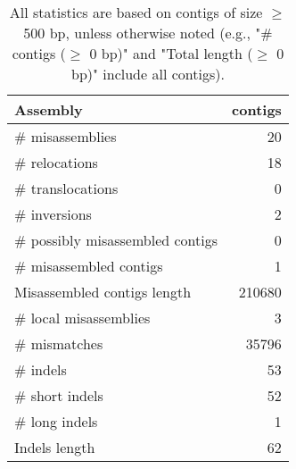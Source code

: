 \documentclass[12pt,a4paper]{article}
\begin{document}
\begin{table}[ht]
\begin{center}
\caption{All statistics are based on contigs of size $\geq$ 500 bp, unless otherwise noted (e.g., "\# contigs ($\geq$ 0 bp)" and "Total length ($\geq$ 0 bp)" include all contigs).}
\begin{tabular}{|l*{1}{|r}|}
\hline
Assembly & contigs \\ \hline
\# misassemblies & 20 \\ \hline
\hspace{5mm}\# relocations & 18 \\ \hline
\hspace{5mm}\# translocations & 0 \\ \hline
\hspace{5mm}\# inversions & 2 \\ \hline
\# possibly misassembled contigs & 0 \\ \hline
\# misassembled contigs & 1 \\ \hline
Misassembled contigs length & 210680 \\ \hline
\# local misassemblies & 3 \\ \hline
\# mismatches & 35796 \\ \hline
\# indels & 53 \\ \hline
\hspace{5mm}\# short indels & 52 \\ \hline
\hspace{5mm}\# long indels & 1 \\ \hline
Indels length & 62 \\ \hline
\end{tabular}
\end{center}
\end{table}
\end{document}
